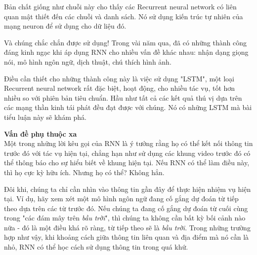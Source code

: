 Bản chất giống như chuỗi này cho thấy các Recurrent neural network có liên quan mật thiết đến các chuỗi và danh sách.
Nó sử dụng kiến trúc tự nhiên của mạng neuron để sử dụng cho dữ liệu đó.

Và chúng chắc chắn được sử dụng!
Trong vài năm qua, đã có những thành công đáng kinh ngạc khi áp dụng RNN cho nhiều vấn đề khác nhau: nhận dạng giọng
nói, mô hình ngôn ngữ, dịch thuật, chú thích hình ảnh.

Điều cần thiết cho những thành công này là việc sử dụng "LSTM", một loại Recurrent neural network rất đặc biệt, hoạt
động, cho nhiều tác vụ, tốt hơn nhiều so với phiên bản tiêu chuẩn. Hầu như tất cả các kết quả thú vị dựa trên các mạng thần kinh tái phát đều đạt được với chúng. Nó có những LSTM mà bài tiểu luận này sẽ khám phá.

\textbf{Vấn đề phụ thuộc xa} \\[0.2em]
Một trong những lời kêu gọi của RNN là ý tưởng rằng họ có thể kết nối thông tin trước đó với tác vụ hiện tại, chẳng
hạn như sử dụng các khung video trước đó có thể thông báo cho sự hiểu biết về khung hiện tại. Nếu RNN có thể làm điều
này, thì họ cực kỳ hữu ích. Nhưng họ có thể? Không hẳn.

Đôi khi, chúng ta chỉ cần nhìn vào thông tin gần đây để thực hiện nhiệm vụ hiện tại. Ví dụ, hãy xem xét một mô hình
ngôn ngữ đang cố gắng dự đoán từ tiếp theo dựa trên các từ trước đó. Nếu chúng ta đang cố gắng dự đoán từ cuối cùng
trong "các đám mây trên \textit{bầu trời}", thì chúng ta không cần bất kỳ bối cảnh nào nữa - đó là một điều khá rõ ràng,
từ tiếp theo sẽ là  \textit{bầu trời}. Trong những trường hợp như vậy, khi khoảng cách giữa thông tin liên quan và
địa điểm mà nó cần là nhỏ, RNN có thể học cách sử dụng thông tin trong quá khứ.

\begin{figure}[H]
\end{figure}


